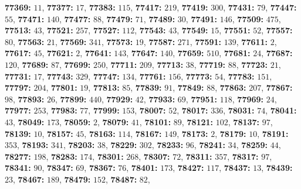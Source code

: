 \textsf{\bfseries 77369:} $11$, \textsf{\bfseries 77377:} $17$, \textsf{\bfseries 77383:} $115$, \textsf{\bfseries 77417:} $219$, \textsf{\bfseries 77419:} $300$, \textsf{\bfseries 77431:} $79$, \textsf{\bfseries 77447:} $55$, \textsf{\bfseries 77471:} $140$, \textsf{\bfseries 77477:} $88$, \textsf{\bfseries 77479:} $71$, \textsf{\bfseries 77489:} $30$, \textsf{\bfseries 77491:} $146$, \textsf{\bfseries 77509:} $475$, \textsf{\bfseries 77513:} $43$, \textsf{\bfseries 77521:} $257$, \textsf{\bfseries 77527:} $112$, \textsf{\bfseries 77543:} $43$, \textsf{\bfseries 77549:} $15$, \textsf{\bfseries 77551:} $52$, \textsf{\bfseries 77557:} $80$, \textsf{\bfseries 77563:} $21$, \textsf{\bfseries 77569:} $341$, \textsf{\bfseries 77573:} $19$, \textsf{\bfseries 77587:} $271$, \textsf{\bfseries 77591:} $139$, \textsf{\bfseries 77611:} $2$, \textsf{\bfseries 77617:} $45$, \textsf{\bfseries 77621:} $2$, \textsf{\bfseries 77641:} $143$, \textsf{\bfseries 77647:} $140$, \textsf{\bfseries 77659:} $510$, \textsf{\bfseries 77681:} $24$, \textsf{\bfseries 77687:} $120$, \textsf{\bfseries 77689:} $87$, \textsf{\bfseries 77699:} $250$, \textsf{\bfseries 77711:} $209$, \textsf{\bfseries 77713:} $38$, \textsf{\bfseries 77719:} $88$, \textsf{\bfseries 77723:} $21$, \textsf{\bfseries 77731:} $17$, \textsf{\bfseries 77743:} $329$, \textsf{\bfseries 77747:} $134$, \textsf{\bfseries 77761:} $156$, \textsf{\bfseries 77773:} $54$, \textsf{\bfseries 77783:} $151$, \textsf{\bfseries 77797:} $204$, \textsf{\bfseries 77801:} $19$, \textsf{\bfseries 77813:} $85$, \textsf{\bfseries 77839:} $91$, \textsf{\bfseries 77849:} $88$, \textsf{\bfseries 77863:} $207$, \textsf{\bfseries 77867:} $98$, \textsf{\bfseries 77893:} $26$, \textsf{\bfseries 77899:} $440$, \textsf{\bfseries 77929:} $42$, \textsf{\bfseries 77933:} $69$, \textsf{\bfseries 77951:} $118$, \textsf{\bfseries 77969:} $24$, \textsf{\bfseries 77977:} $253$, \textsf{\bfseries 77983:} $77$, \textsf{\bfseries 77999:} $153$, \textsf{\bfseries 78007:} $52$, \textsf{\bfseries 78017:} $336$, \textsf{\bfseries 78031:} $74$, \textsf{\bfseries 78041:} $43$, \textsf{\bfseries 78049:} $173$, \textsf{\bfseries 78059:} $2$, \textsf{\bfseries 78079:} $41$, \textsf{\bfseries 78101:} $89$, \textsf{\bfseries 78121:} $102$, \textsf{\bfseries 78137:} $97$, \textsf{\bfseries 78139:} $10$, \textsf{\bfseries 78157:} $45$, \textsf{\bfseries 78163:} $114$, \textsf{\bfseries 78167:} $149$, \textsf{\bfseries 78173:} $2$, \textsf{\bfseries 78179:} $10$, \textsf{\bfseries 78191:} $353$, \textsf{\bfseries 78193:} $341$, \textsf{\bfseries 78203:} $38$, \textsf{\bfseries 78229:} $302$, \textsf{\bfseries 78233:} $96$, \textsf{\bfseries 78241:} $34$, \textsf{\bfseries 78259:} $44$, \textsf{\bfseries 78277:} $198$, \textsf{\bfseries 78283:} $174$, \textsf{\bfseries 78301:} $268$, \textsf{\bfseries 78307:} $72$, \textsf{\bfseries 78311:} $357$, \textsf{\bfseries 78317:} $97$, \textsf{\bfseries 78341:} $90$, \textsf{\bfseries 78347:} $69$, \textsf{\bfseries 78367:} $76$, \textsf{\bfseries 78401:} $173$, \textsf{\bfseries 78427:} $117$, \textsf{\bfseries 78437:} $13$, \textsf{\bfseries 78439:} $23$, \textsf{\bfseries 78467:} $189$, \textsf{\bfseries 78479:} $152$, \textsf{\bfseries 78487:} $82$, 
